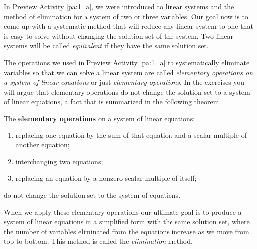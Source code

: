 
In Preview Activity \ref{pa:1_a}, we were introduced to linear systems and the method of elimination for a system of two or three variables. Our goal now is to come up with a systematic method that will reduce any linear system to one that is easy to solve without changing the solution set of the system. Two linear systems will be called \emph{equivalent} if they have the same solution set. 

The operations we used in Preview Activity \ref{pa:1_a} to systematically eliminate variables so that we can solve a linear system are called \emph{elementary operations on a system of linear equations} or just \emph{elementary operations}. In the exercises you will argue that elementary operations do not change the solution set to a system of linear equations, a fact that is summarized in the following theorem.

\begin{theorem} The \textbf{elementary operations} on a system of linear equations: 
\begin{enumerate}
\item replacing one equation by the sum of that equation and a scalar multiple of another equation;
\item interchanging two equations;
\item replacing an equation by a nonzero scalar multiple of itself;
\end{enumerate}
do not change the solution set to the system of equations.
\end{theorem}

When we apply these elementary operations our ultimate goal is to produce a system of linear equations in a simplified form with the same solution set, where the number of variables eliminated from the equations increase as we move from top to bottom. This method is called the \emph{elimination} method. 


